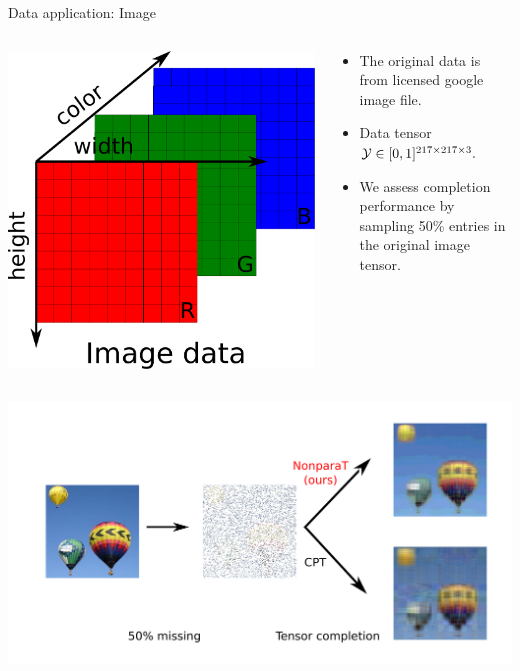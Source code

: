 \documentclass[10pt, mathserif]{beamer} %
\theoremstyle{definition}
\theoremstyle{plain}
\begin{document}
\begin{frame}{Data application: Image}
 \begin{columns}
\begin{column}{0.20\textwidth}
   \begin{center}
     \includegraphics[width=\textwidth]{Figures/imgdata.pdf}
     \end{center}
\end{column}
\begin{column}{0.7\textwidth} 
\begin{itemize}
    \item The original data is from licensed google image file.
    \item Data tensor $\mathcal{Y}\in[0,1]^{217\times217\times3}.$ 
    \item We assess completion performance by sampling 50\% entries in the original image tensor.
\end{itemize}
\end{column}
\end{columns}


      \begin{center}
    \includegraphics[width =\textwidth]{Figures/imageresult.pdf}
    \end{center}
\end{frame}
\end{document}
